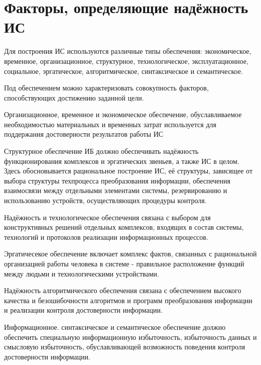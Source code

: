 \documentclass[a4paper, 12pt]{extarticle}
\begin{document}
	\section{Факторы, определяющие надёжность ИС}
		Для построения ИС используются различные типы обеспечения: экономическое, временное, организационное, структурное, технологическое, эксплуатационное, социальное, эргатическое, алгоритмическое, синтаксическое и семантическое.

		Под обеспечением можно характеризовать совокупность факторов, способствующих достижению заданной цели.

		Организационное, временное и экономическое обеспечение, обуславливаемое необходимостью материальных и временных затрат используется для поддержания достоверности результатов работы ИС

		Структурное обеспечение ИБ должно обеспечивать надёжность функционирования комплексов и эргатических звеньев, а также ИС в целом.
		Здесь обосновывается рациональное построение ИС, её структуры, зависящее от выбора структуры техпроцесса преобразования информации, обеспечения взаимосвязи между отдельными элементами системы, резервированию и использованию устройств, осуществляющих процедуры контроля.

		Надёжность и технологическое обеспечения связана с выбором для конструктивных решений отдельных комплексов, входящих в состав системы, технологий и протоколов реализации информационных процессов.

		Эргатичесекое обеспечение включает комплекс фактов, связанных с рациональной организацией работы человека в системе - правильное расположение функций между людьми и технологическими устройствами.

		Надёжность алгоритмического обеспечения связана с обеспечением высокого качества и безошибочности алгоритмов и программ преобразования информации и реализации контроля достоверности информации.

		Информационное. синтаксическое и семантическое обеспечение должно обеспечить специальную информационную избыточность, избыточность данных и смысловую избыточность, обуславливающей возможность поведения контроля достоверности информации.
\end{document}
